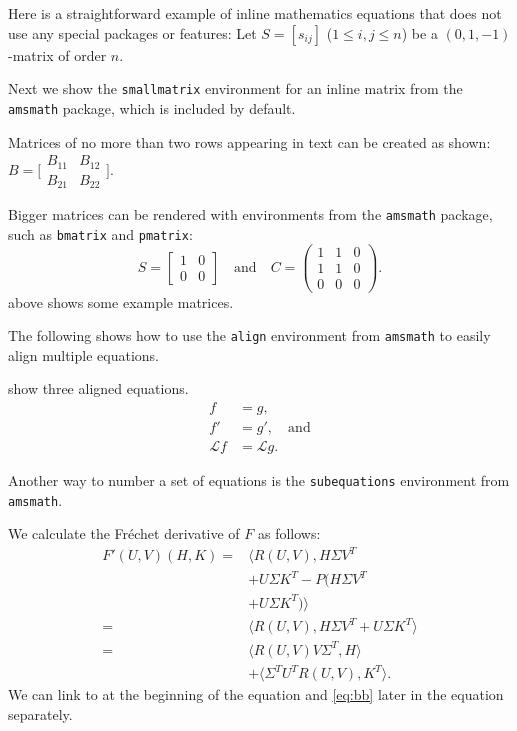\documentclass[twoside,leqno,twocolumn]{article}
\begin{document}
Here is a straightforward example of inline mathematics
equations that does not use any special packages or features: 
Let $S=[s_{ij}]$ ($1\leq i,j\leq n$) be a $(0,1,-1)$-matrix of order $n$.

Next we show the \texttt{smallmatrix} environment for an
inline matrix from the \texttt{amsmath} package, which is included by
default.

Matrices of no more than two rows appearing in text can be created
as shown:
$B = \bigl[ \begin{smallmatrix} B_{11} & B_{12} \\ 
  B_{21} & B_{22} \end{smallmatrix} \bigr]$.

Bigger matrices can be rendered with environments from
the \texttt{amsmath} package, such as \texttt{bmatrix} and
\texttt{pmatrix}:
\begin{equation}\label{eq:matrices}
  S=\begin{bmatrix}1&0\\0&0\end{bmatrix}
  \quad\text{and}\quad
  C=\begin{pmatrix}1&1&0\\1&1&0\\0&0&0\end{pmatrix}.
\end{equation}
 above shows some example matrices.

The following shows how to use the \texttt{align} environment from
\texttt{amsmath} to easily align multiple equations.

 show three aligned equations.
\begin{align} 
  f &= g, \label{eq:a} \\
  f' &= g', \quad\text{and} \label{eq:b} \\
  \mathcal{L}f &= \mathcal{L}g \label{eq:c}.
\end{align}

Another way to number a set of equations is the
\texttt{subequations} environment from \texttt{amsmath}.

We calculate the Fr\'{e}chet derivative of $F$ as follows:
\vspace{-12pt}
\begin{subequations}
\begin{align}
  F'(U,V)(H,K) = &\langle R(U,V),H\Sigma V^{T} \label{eq:aa}\\
  &+ U\Sigma K^{T} - P(H\Sigma V^{T}  \nonumber \\
  &+ U\Sigma K^{T})\rangle  \nonumber \\
  = &\langle R(U,V),H\Sigma V^{T} + U\Sigma K^{T}\rangle \nonumber \\
  = &\langle R(U,V)V\Sigma^{T},H\rangle \label{eq:bb}\\
  &+ \langle \Sigma^{T}U^{T}R(U,V),K^{T}\rangle.  \nonumber
\end{align}
\end{subequations}
We can link to  at the beginning of the equation and \cref{eq:bb} later in the equation separately.
\end{document}
